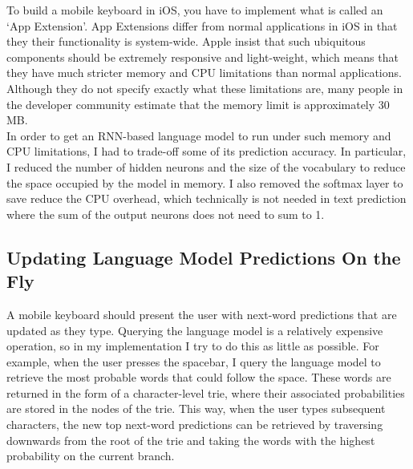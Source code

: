 \documentclass[a4paper, 12pt]{report}
\begin{document}
To build a mobile keyboard in iOS, you have to implement what is called an `App Extension'. App Extensions differ from normal applications in iOS in that they their functionality is system-wide. Apple insist that such ubiquitous components should be extremely responsive and light-weight, which means that they have much stricter memory and CPU limitations than normal applications. Although they do not specify exactly what these limitations are, many people in the developer community estimate that the memory limit is approximately 30 MB. \\

In order to get an RNN-based language model to run under such memory and CPU limitations, I had to trade-off some of its prediction accuracy. In particular, I reduced the number of hidden neurons and the size of the vocabulary to reduce the space occupied by the model in memory. I also removed the softmax layer to save reduce the CPU overhead, which technically is not needed in text prediction where the sum of the output neurons does not need to sum to 1.

\subsection{Updating Language Model Predictions On the Fly}

A mobile keyboard should present the user with next-word predictions that are updated as they type. Querying the language model is a relatively expensive operation, so in my implementation I try to do this as little as possible. For example, when the user presses the spacebar, I query the language model to retrieve the most probable words that could follow the space. These words are returned in the form of a character-level trie, where their associated probabilities are stored in the nodes of the trie. This way, when the user types subsequent characters, the new top next-word predictions can be retrieved by traversing downwards from the root of the trie and taking the words with the highest probability on the current branch. \\
\end{document}
